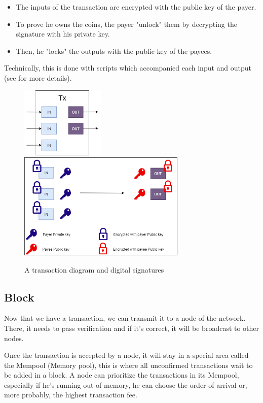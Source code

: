 \begin{itemize}
  \item The inputs of the transaction are encrypted with the public key of the payer.
  \item To prove he owns the coins, the payer "unlock" them by decrypting the signature with his private key.
  \item Then, he "locks" the outputs with the public key of the payees.
\end{itemize}

Technically, this is done with scripts which accompanied each input and output (see \cite{broken_crypto_primitives} for more details).


\begin{figure}[h]
\centering
\includegraphics[width=4cm]{Figures/Transaction}
\hspace{1cm}
\includegraphics[width=8cm]{Figures/Transaction2}
\caption{A transaction diagram and digital signatures}
\label{transaction}
\end{figure}

  \subsection{Block}

Now that we have a transaction, we can transmit it to a node of the network. There, it needs to pass verification and if it's correct, it will be broadcast to other nodes. \newline

Once the transaction is accepted by a node, it will stay in a special area called the Mempool (Memory pool), this is where all unconfirmed transactions wait to be added in a block. A node can prioritize the transactions in its Mempool, especially if he's running out of memory, he can choose the order of arrival or, more probably, the highest transaction fee.

